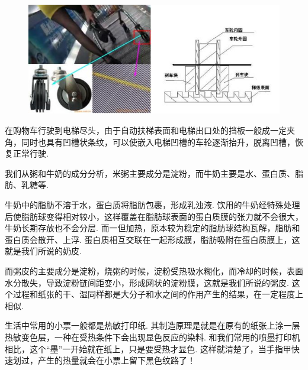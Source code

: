 \begin{multicols}{2}
\begin{figure}[H]
\centering
\includegraphics[width=\linewidth]{IMG/201911/image2.jpeg}
\end{figure}

在购物车行驶到电梯尽头，由于自动扶梯表面和电梯出口处的挡板一般成一定夹角，同时也具有凹槽状条纹，可以使嵌入电梯凹槽的车轮逐渐抬升，脱离凹槽，恢复正常行驶. 

\noindent{}

我们从粥和牛奶的成分分析，米粥主要成分是淀粉，而牛奶主要是水、蛋白质、脂肪、乳糖等. 

牛奶中的脂肪不溶于水，蛋白质将脂肪包裹，形成乳浊液. 饮用的牛奶经特殊处理后使脂肪球变得相对较小，这样覆盖在脂肪球表面的蛋白质膜的张力就不会很大，牛奶长期存放也不会分层. 而一但加热，原本较为稳定的脂肪球结构瓦解，脂肪和蛋白质会散开、上浮. 蛋白质相互交联在一起形成膜，脂肪吸附在蛋白质膜上，这就是我们所说的奶皮. 

而粥皮的主要成分是淀粉，烧粥的时候，淀粉受热吸水糊化，而冷却的时候，表面水分散失，导致淀粉链间距变小，形成网状的淀粉膜，这就是我们所说的粥皮. 这个过程和纸张的干、湿同样都是大分子和水之间的作用产生的结果，在一定程度上相似. 

\noindent{}

生活中常用的小票一般都是热敏打印纸. 其制造原理是就是在原有的纸张上涂一层热敏变色层，一种在受热条件下会出现显色反应的染料. 和我们常用的喷墨打印机相比，这个“墨”一开始就在纸上，只是要受热才显色. 这样就清楚了，当手指甲快速划过，产生的热量就会在小票上留下黑色纹路了！

\end{multicols}


